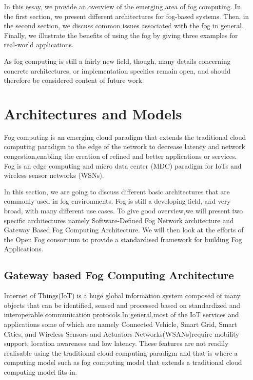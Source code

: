 \documentclass{article}
\begin{document}
In this essay, we provide an overview of the emerging area of fog computing. In the first section, we present different architectures for fog-based systems. Then, in the second section, we discuss common issues associated with the fog in general. Finally, we illustrate the benefits of using the fog by giving three examples for real-world applications.

As fog computing is still a fairly new field, though, many details concerning concrete architectures, or implementation specifics remain open, and should therefore be considered content of future work.

\pagebreak

\section{Architectures and Models}
Fog computing is an emerging cloud paradigm that extends the traditional cloud computing paradigm to the edge of the network to decrease latency and network congestion,enabling the creation of refined and better applications or services. Fog is an edge computing and micro data center (MDC) paradigm for IoTs and wireless sensor networks (WSNs).

In this section, we are going to discuss different basic architectures that are commonly used in fog environments. Fog is still a developing field, and very broad, with many different use cases. To give good overview,we will present two specific architectures namely Software-Defined Fog Network architecture and Gateway Based Fog Computing Architecture.
We will then look at the efforts of the Open Fog consortium to provide a standardised framework for building Fog Applications.

\subsection{Gateway based Fog Computing Architecture}

Internet of Things(IoT) is a huge global information system composed of many objects that can be identified, sensed and processed based on standardized and interoperable
communication protocols\cite{lee2016gateway}.In general,most of the IoT services and applications some of which are namely Connected Vehicle, Smart Grid, Smart Cities, and Wireless Sensors and Actuators Networks(WSANs)require mobility support, location
awareness and low latency\cite{lee2016gateway}. These features are not readily realisable using the traditional cloud computing paradigm and that is where a computing model such as fog computing model that extends a traditional cloud computing model fits in.
\end{document}
